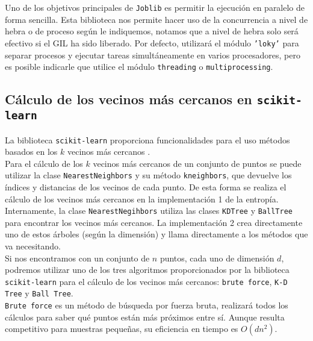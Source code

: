 \documentclass[12pt,a4paper]{report} %
\theoremstyle{definition}
\begin{document}
Uno de los objetivos principales de \texttt{Joblib} \cite{joblib} es permitir la ejecución en paralelo de forma sencilla. Esta biblioteca nos permite hacer uso de la concurrencia a nivel de hebra o de proceso según le indiquemos, notamos que a nivel de hebra solo será efectivo si el GIL ha sido liberado. Por defecto, utilizará el módulo \texttt{'loky'} para separar procesos y ejecutar tareas simultáneamente en varios procesadores, pero es posible indicarle que utilice el módulo \texttt{threading} o \texttt{multiprocessing}.\\

\subsection{Cálculo de los vecinos más cercanos en \texttt{scikit-learn}}
La biblioteca \texttt{scikit-learn} proporciona funcionalidades para el uso métodos basados en los $k$ vecinos más cercanos \cite{doc_nn}.\\

Para el cálculo de los $k$ vecinos más cercanos de un conjunto de puntos se puede utilizar la clase \texttt{NearestNeighbors} \cite{nearestneighbors} y su método \texttt{kneighbors}, que devuelve los índices y distancias de los vecinos de cada punto. De esta forma se realiza el cálculo de los vecinos más cercanos en la implementación 1 de la entropía. Internamente, la clase \texttt{NearestNegihbors} utiliza las clases \texttt{KDTree} y \texttt{BallTree} para encontrar los vecinos más cercanos. La implementación 2 crea directamente uno de estos árboles (según la dimensión) y llama directamente a los métodos que va necesitando.\\

Si nos encontramos con un conjunto de $n$ puntos, cada uno de dimensión $d$, podremos utilizar uno de los tres algoritmos proporcionados por la biblioteca \texttt{scikit-learn} para el cálculo de los vecinos más cercanos: \texttt{brute force}, \texttt{K-D Tree} y \texttt{Ball Tree}.\\

\texttt{Brute force} es un método de búsqueda por fuerza bruta, realizará todos los cálculos para saber qué puntos están más próximos entre sí. Aunque resulta competitivo para muestras pequeñas, su eficiencia en tiempo es $O(dn^2)$.\\
\end{document}
